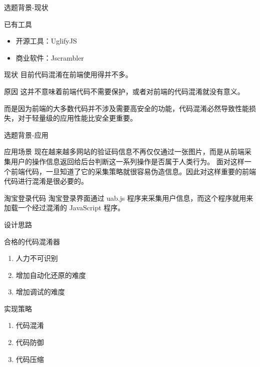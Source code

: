 \documentclass[presentation]{beamer}
\begin{document}
\begin{frame}[label=sec-4]{选题背景-现状}
\begin{block}{已有工具}
\begin{itemize}
\item 开源工具：UglifyJS
\item 商业软件：Jscrambler
\end{itemize}
\end{block}
\begin{block}{现状}
目前代码混淆在前端使用得并不多。
\begin{block}{原因}
这并不意味着前端代码不需要保护，或者对前端的代码混淆就没有意义。

而是因为前端的大多数代码并不涉及需要高安全的功能，代码混淆必然导致性能损失，对于轻量级的应用性能比安全更重要。
\end{block}
\end{block}
\end{frame}
\begin{frame}[label=sec-5]{选题背景-应用}
\begin{block}{应用场景}
现在越来越多网站的验证码信息不再仅仅通过一张图片，而是从前端采集用户的操作信息返回给后台判断这一系列操作是否属于人类行为。
面对这样一个前端代码，一旦知道了它的采集策略就很容易伪造信息。因此对这样重要的前端代码进行混淆是很必要的。
\end{block}
\begin{block}{淘宝登录代码}
淘宝登录界面通过 uab.js 程序来采集用户信息，而这个程序就用来加载一个经过混淆的 JavaScript 程序。
\end{block}
\end{frame}
\begin{frame}[label=sec-6]{设计思路}
\begin{block}{合格的代码混淆器}
\begin{enumerate}
\item 人力不可识别
\item 增加自动化还原的难度
\item 增加调试的难度
\end{enumerate}
\end{block}
\begin{block}{实现策略}
\begin{enumerate}
\item 代码混淆
\item 代码防御
\item 代码压缩
\end{enumerate}
\end{block}
\end{frame}
\end{document}
